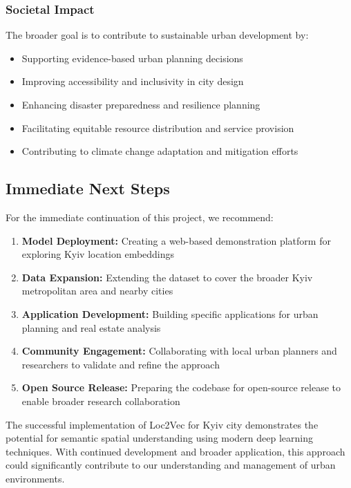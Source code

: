 \subsubsection{Societal Impact}

The broader goal is to contribute to sustainable urban development by:

\begin{itemize}
    \item Supporting evidence-based urban planning decisions
    \item Improving accessibility and inclusivity in city design
    \item Enhancing disaster preparedness and resilience planning
    \item Facilitating equitable resource distribution and service provision
    \item Contributing to climate change adaptation and mitigation efforts
\end{itemize}

\subsection{Immediate Next Steps}

For the immediate continuation of this project, we recommend:

\begin{enumerate}
    \item \textbf{Model Deployment:} Creating a web-based demonstration platform for exploring Kyiv location embeddings
    \item \textbf{Data Expansion:} Extending the dataset to cover the broader Kyiv metropolitan area and nearby cities
    \item \textbf{Application Development:} Building specific applications for urban planning and real estate analysis
    \item \textbf{Community Engagement:} Collaborating with local urban planners and researchers to validate and refine the approach
    \item \textbf{Open Source Release:} Preparing the codebase for open-source release to enable broader research collaboration
\end{enumerate}

The successful implementation of Loc2Vec for Kyiv city demonstrates the potential for semantic spatial understanding using modern deep learning techniques. With continued development and broader application, this approach could significantly contribute to our understanding and management of urban environments.
